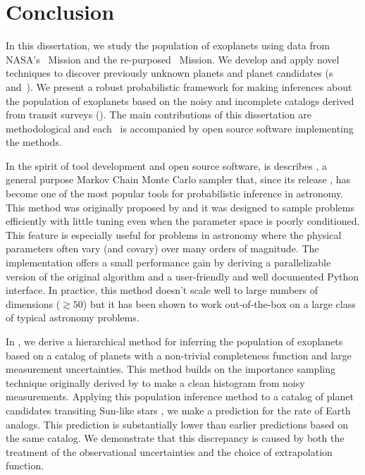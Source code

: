 \chapter*{Conclusion}

In this dissertation, we study the population of exoplanets using data from
NASA's \kepler\ Mission and the re-purposed \KT\ Mission.
We develop and apply novel techniques to discover previously unknown planets
and planet candidates (\chapname s~ and~).
We present a robust probabilistic framework for making inferences about the
population of exoplanets based on the noisy and incomplete catalogs derived
from transit surveys ().
The main contributions of this dissertation are methodological and each
\chapname\ is accompanied by open source software implementing the methods.

In the spirit of tool development and open source software,  is
describes , a general purpose Markov Chain Monte Carlo sampler
that, since its release \citep{Foreman-Mackey:2013}, has become one of the
most popular tools for probabilistic inference in astronomy.
This method was originally proposed by \citet{Goodman:2010} and it was
designed to sample problems efficiently with little tuning even when the
parameter space is poorly conditioned.
This feature is especially useful for problems in astronomy where the physical
parameters often vary (and covary) over many orders of magnitude.
The  implementation offers a small performance gain by deriving
a parallelizable version of the original algorithm and a user-friendly and
well documented Python interface.
In practice, this method doesn't scale well to large numbers of dimensions
($\gtrsim 50$) but it has been shown to work out-of-the-box on a large class
of typical astronomy problems.

In , we derive a hierarchical method for inferring the population
of exoplanets based on a catalog of planets with a non-trivial completeness
function and large measurement uncertainties.
This method builds on the importance sampling technique originally derived by
\citet{Hogg:2010a} to make a clean histogram from noisy measurements.
Applying this population inference method to a catalog of planet candidates
transiting Sun-like stars \citep{Petigura:2013}, we make a prediction for the
rate of Earth analogs.
This prediction is substantially lower than earlier predictions based on the
same catalog.
We demonstrate that this discrepancy is caused by both the treatment of the
observational uncertainties and the choice of extrapolation function.

